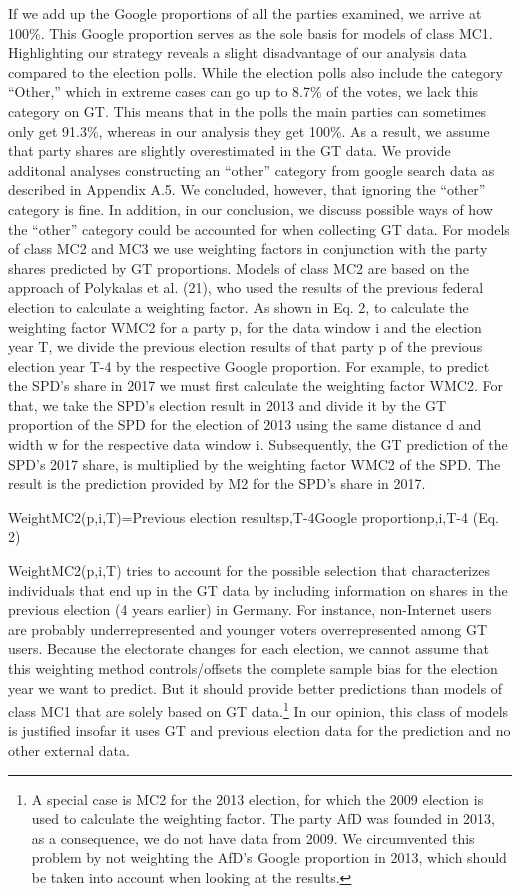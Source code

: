 \documentclass[
  letterpaper,
  DIV=11,
  numbers=noendperiod]{scrartcl}
\begin{document}
If we add up the Google proportions of all the parties examined, we
arrive at 100\%. This Google proportion serves as the sole basis for
models of class MC1. Highlighting our strategy reveals a slight
disadvantage of our analysis data compared to the election polls. While
the election polls also include the category ``Other,'' which in extreme
cases can go up to 8.7\% of the votes, we lack this category on GT. This
means that in the polls the main parties can sometimes only get 91.3\%,
whereas in our analysis they get 100\%. As a result, we assume that
party shares are slightly overestimated in the GT data. We provide
additonal analyses constructing an ``other'' category from google search
data as described in Appendix A.5. We concluded, however, that ignoring
the ``other'' category is fine. In addition, in our conclusion, we
discuss possible ways of how the ``other'' category could be accounted
for when collecting GT data. For models of class MC2 and MC3 we use
weighting factors in conjunction with the party shares predicted by GT
proportions. Models of class MC2 are based on the approach of Polykalas
et al. (21), who used the results of the previous federal election to
calculate a weighting factor. As shown in Eq. 2, to calculate the
weighting factor WMC2 for a party p, for the data window i and the
election year T, we divide the previous election results of that party p
of the previous election year T-4 by the respective Google proportion.
For example, to predict the SPD's share in 2017 we must first calculate
the weighting factor WMC2. For that, we take the SPD's election result
in 2013 and divide it by the GT proportion of the SPD for the election
of 2013 using the same distance d and width w for the respective data
window i. Subsequently, the GT prediction of the SPD's 2017 share, is
multiplied by the weighting factor WMC2 of the SPD. The result is the
prediction provided by M2 for the SPD's share in 2017.

WeightMC2(p,i,T)=Previous election resultsp,T-4Google proportionp,i,T-4
(Eq. 2)

WeightMC2(p,i,T) tries to account for the possible selection that
characterizes individuals that end up in the GT data by including
information on shares in the previous election (4 years earlier) in
Germany. For instance, non-Internet users are probably underrepresented
and younger voters overrepresented among GT users. Because the
electorate changes for each election, we cannot assume that this
weighting method controls/offsets the complete sample bias for the
election year we want to predict. But it should provide better
predictions than models of class MC1 that are solely based on GT
data.\footnote{A special case is MC2 for the 2013 election, for which
  the 2009 election is used to calculate the weighting factor. The party
  AfD was founded in 2013, as a consequence, we do not have data from
  2009. We circumvented this problem by not weighting the AfD's Google
  proportion in 2013, which should be taken into account when looking at
  the results.} In our opinion, this class of models is justified
insofar it uses GT and previous election data for the prediction and no
other external data.
\end{document}
